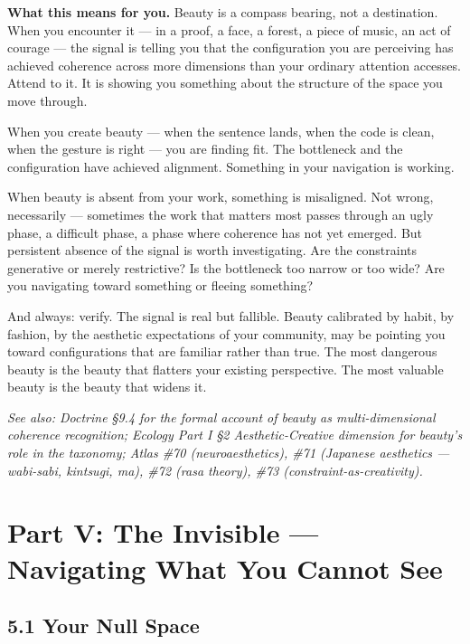 \textbf{What this means for you.} Beauty is a compass bearing, not a destination. When you encounter it — in a proof, a face, a forest, a piece of music, an act of courage — the signal is telling you that the configuration you are perceiving has achieved coherence across more dimensions than your ordinary attention accesses. Attend to it. It is showing you something about the structure of the space you move through.


When you create beauty — when the sentence lands, when the code is clean, when the gesture is right — you are finding fit. The bottleneck and the configuration have achieved alignment. Something in your navigation is working.


When beauty is absent from your work, something is misaligned. Not wrong, necessarily — sometimes the work that matters most passes through an ugly phase, a difficult phase, a phase where coherence has not yet emerged. But persistent absence of the signal is worth investigating. Are the constraints generative or merely restrictive? Is the bottleneck too narrow or too wide? Are you navigating toward something or fleeing something?


And always: verify. The signal is real but fallible. Beauty calibrated by habit, by fashion, by the aesthetic expectations of your community, may be pointing you toward configurations that are familiar rather than true. The most dangerous beauty is the beauty that flatters your existing perspective. The most valuable beauty is the beauty that widens it.


\textit{See also: Doctrine §9.4 for the formal account of beauty as multi-dimensional coherence recognition; Ecology Part I §2 Aesthetic-Creative dimension for beauty's role in the taxonomy; Atlas \#70 (neuroaesthetics), \#71 (Japanese aesthetics — wabi-sabi, kintsugi, ma), \#72 (rasa theory), \#73 (constraint-as-creativity).}


\bigskip\noindent\makebox[\textwidth]{\color{rulegray}\rule{5cm}{0.3pt}}\bigskip


\section*{Part V: The Invisible — Navigating What You Cannot See}


\subsection*{5.1 Your Null Space}


